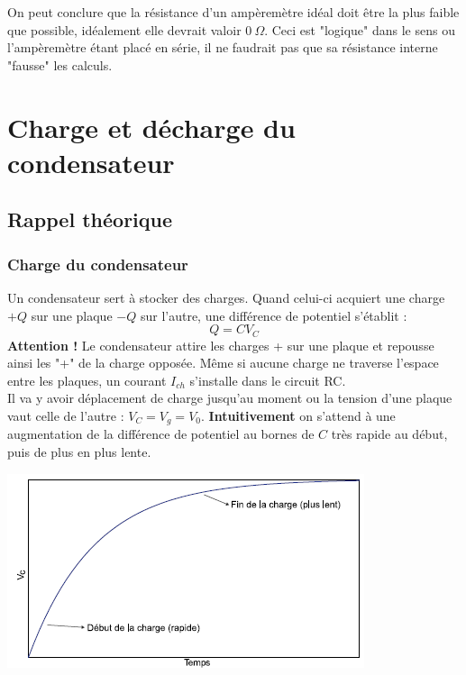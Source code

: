 \documentclass	[11pt, a4paper, openany]{book}
\begin{document}
		On peut conclure que la résistance d'un ampèremètre idéal doit être la plus faible que possible, idéalement elle devrait valoir $0\ \Omega$. Ceci est "logique" dans le sens ou l'ampèremètre étant placé en série, il ne faudrait pas que sa résistance interne "fausse" les calculs.
		
		
		
		
		
		
		
		\newpage
		\section{Charge et décharge du condensateur}
		\subsection{Rappel théorique}
		\subsubsection*{Charge du condensateur}
		Un condensateur sert à stocker des charges. Quand celui-ci acquiert une charge $+Q$ sur une plaque $-Q$ sur l'autre, une différence de potentiel s'établit : 
		\begin{equation}
			Q = CV_C
		\end{equation}
		\textbf{Attention !} Le condensateur attire les charges + sur une plaque et repousse ainsi les "+" de la charge opposée. Même si aucune charge ne traverse l'espace entre les plaques, un courant $I_{ch}$ s'installe dans le circuit RC.\\
		
		Il va y avoir déplacement de charge jusqu'au moment ou la tension d'une plaque vaut celle de l'autre : $V_C = V_g = V_0$. \textbf{Intuitivement} on s'attend à une augmentation de la différence de potentiel au bornes de $C$ très rapide au début, puis de plus en plus lente.
		
		\begin{center}
			\includegraphics[scale=0.5]{labo/image13.png}
		\end{center}
		
\end{document}
